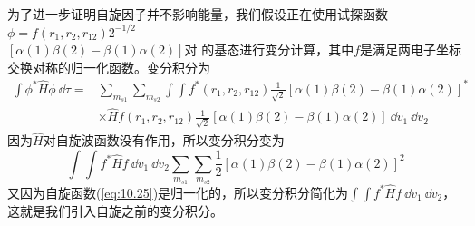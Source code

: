     为了进一步证明自旋因子并不影响能量，我们假设正在使用试探函数$\phi = f\left(r_1, r_2, r_{12}\right)2^{-1/2}$\\$ \left[\alpha\left(1\right)\beta\left(2\right) - \beta\left(1\right)\alpha\left(2\right)\right]$对  的基态进行变分计算，其中$f$是满足两电子坐标交换对称的归一化函数。变分积分为
    \begin{equation*}
        \begin{aligned}
            \int \phi^* \hat{H} \phi \: \dd \tau =& \sum_{m_{s1}} \sum_{m_{s2}} \int \int f^* \left(r_1, r_2, r_{12}\right) \frac{1}{\sqrt{2}} \left[\alpha\left(1\right)\beta\left(2\right) - \beta\left(1\right)\alpha\left(2\right)\right]^* \\
            & \times \hat{H} f \left(r_1, r_2, r_{12}\right) \frac{1}{\sqrt{2}} \left[\alpha\left(1\right)\beta\left(2\right) - \beta\left(1\right)\alpha\left(2\right)\right] \: \dd v_1 \: \dd v_2
        \end{aligned}
    \end{equation*}
    因为$\hat{H}$对自旋波函数没有作用，所以变分积分变为
    \begin{equation*}
        \int \int f^* \hat{H} f \:\dd v_1 \: \dd v_2 \sum_{m_{s1}} \sum_{m_{s2}} \frac{1}{2} \left[\alpha\left(1\right)\beta\left(2\right) - \beta\left(1\right)\alpha\left(2\right)\right]^2
    \end{equation*}
    又因为自旋函数(\ref{eq:10.25})是归一化的，所以变分积分简化为$\int \int f^* \hat{H} f \:\dd v_1 \: \dd v_2$，这就是我们引入自旋之前的变分积分。

